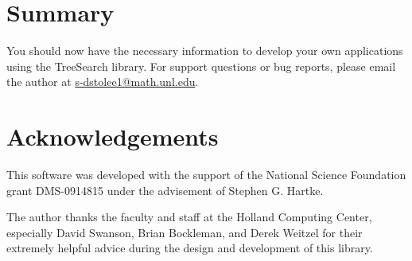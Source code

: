\documentclass[11pt]{article}
\begin{document}
\section{Summary}
\label{sec:Summary}

You should now have the necessary information to develop your own applications
	using the TreeSearch library.
For support questions or bug reports, please email 	the author at 
	\href{mailto:s-dstolee1@math.unl.edu}{s-dstolee1@math.unl.edu}.

\section{Acknowledgements}

This software was developed with the support of the National Science Foundation grant DMS-0914815
	under the advisement of Stephen G. Hartke.

The author thanks the faculty and staff
	at the Holland Computing Center,
	especially David Swanson, Brian Bockleman, and Derek Weitzel for their extremely helpful advice
	during the design and development of this library.






\end{document}
